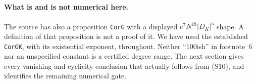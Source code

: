 \paragraph{What is and is not numerical here.}
The source has also a proposition \texttt{CorG} with a displayed
$e^7N^{18}|D_K|^5$ shape. A definition of that proposition is not a
proof of it. We have used the established \texttt{CorGK}, with its
existential exponent, throughout. Neither ``100ish'' in footnote~6
nor an unspecified constant is a certified degree range. The next
section gives every vanishing and cyclicity conclusion that actually
follows from (S10), and identifies the remaining numerical gate.
